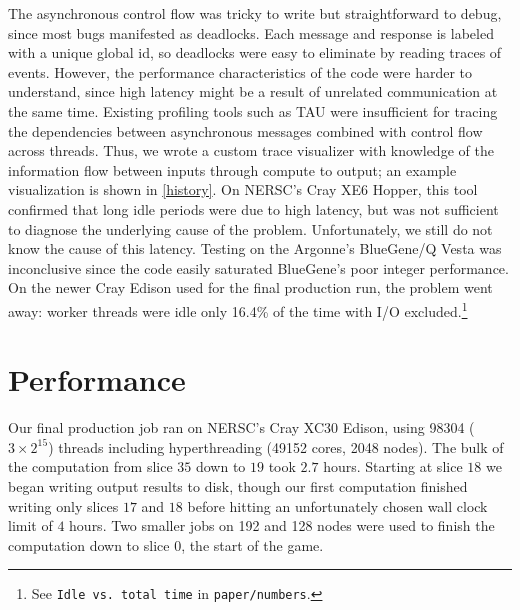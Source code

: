 \documentclass[conference]{IEEEtran}
\begin{document}
The asynchronous control flow was tricky to write but straightforward to debug,
since most bugs manifested as deadlocks.  Each message and response is labeled with a unique global id,
so deadlocks were easy to eliminate by reading traces of events.  However, the performance
characteristics of the code were harder to understand, since high latency might be a result of
unrelated communication at the same time.  Existing profiling tools such as TAU
\cite{shende2006tau} were insufficient for tracing the dependencies between asynchronous messages
combined with control flow across threads.  Thus, we wrote a custom trace visualizer with
knowledge of the information flow between inputs through compute to output; an example visualization is
shown in \autoref{history}.  On NERSC's Cray XE6 Hopper, this tool confirmed that long idle periods
were due to high latency, but was not sufficient to diagnose the underlying cause of the problem.
Unfortunately, we still do not know the cause of this latency.  Testing on the Argonne's BlueGene/Q Vesta
was inconclusive since the code easily saturated BlueGene's poor integer performance.  On the newer Cray
Edison used for the final production run, the problem went away: worker threads were idle only
16.4\% of the time with I/O excluded.\cprotect\footnote{See \verb+Idle vs. total time+ in
\verb+paper/numbers+\label{idle}.}

\section{Performance}

Our final production job ran on NERSC's Cray XC30 Edison, using 98304 ($3 \times 2^{15}$) threads
including hyperthreading (49152 cores, 2048 nodes).  The bulk of the computation from slice $35$ down
to $19$ took $2.7$ hours.  Starting at slice $18$ we began writing output results to disk, though our
first computation finished writing only slices $17$ and $18$ before hitting an unfortunately chosen
wall clock limit of $4$ hours.  Two smaller jobs on 192 and 128 nodes were used to finish the computation
down to slice $0$, the start of the game.
\end{document}
